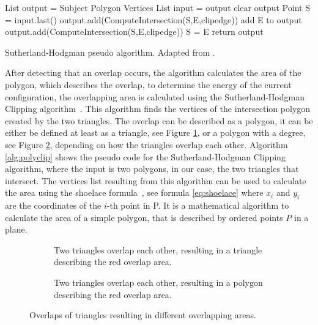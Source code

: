 \documentclass[draft,final]{vutinfth} %
\begin{document}
\begin{algorithm}
List output = Subject Polygon Vertices\;
{
List input = output\;
clear output\;
Point S = input.last()\;
{
{
{
output.add(ComputeIntersection(S,E,clipedge))\;
}
add E to output\;
}
{
{
output.add(ComputeIntersection(S,E,clipedge))\;
}
S = E\;
}
}
}
return output\;
\caption{Sutherland-Hodgman pseudo algorithm. Adapted from \cite{wiki:polygonclip}.}
\label{alg:polyclip}
\end{algorithm}

After detecting that an overlap occurs, the algorithm calculates the area of the polygon, which describes the overlap, to determine the energy of the current configuration, the overlapping area is calculated using the Sutherland-Hodgman Clipping algorithm~\cite{sutherland1974reentrant}. This algorithm finds the vertices of the intersection polygon created by the two triangles. The overlap can be described as a polygon, it can be either be defined at least as a triangle, see Figure \ref{fig:overlap1}, or a polygon with a degree, see Figure \ref{fig:overlap2}, depending on how the triangles overlap each other. Algorithm \ref{alg:polyclip} shows the pseudo code for the Sutherland-Hodgman Clipping algorithm, where the input is two polygons, in our case, the two triangles that intersect. The vertices list resulting from this algorithm can be used to calculate the area using the shoelace formula~\cite{vslapak2017automated}, see formula \ref{eq:shoelace} where $x_i$ and $y_i$ are the coordinates of the $i$-th point in P. It is a mathematical algorithm to calculate the area of a simple polygon, that is described by ordered points $P$ in a plane.

\begin{figure}
\centering
\begin{subfigure}[t]{.4\textwidth}
	
  \caption{Two triangles overlap each other, resulting in a triangle describing the red overlap area.}
	\label{fig:overlap1}
\end{subfigure}%
\hspace{.1\textwidth}
\begin{subfigure}[t]{.4\textwidth}
	
	\caption{Two triangles overlap each other, resulting in a polygon describing the red overlap area.}
	\label{fig:overlap2}
\end{subfigure}
\caption{Overlaps of triangles resulting in different overlapping areas.}
\label{fig:overlap}
\end{figure}
\end{document}
